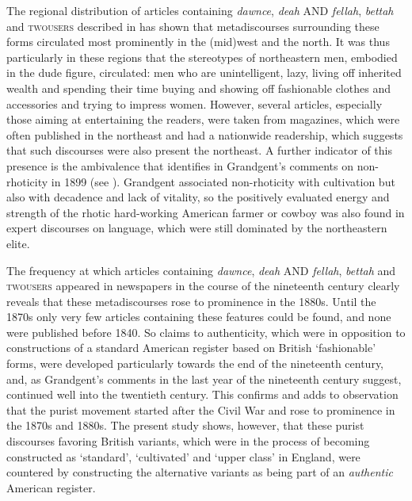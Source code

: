 The regional distribution of articles containing \emph{dawnce}, \emph{deah} AND \emph{fellah}, \emph{bettah} and \textsc{twousers} described in  has shown that metadiscourses surrounding these forms circulated most prominently in the (mid)west and the north. It was thus particularly in these regions that the stereotypes of northeastern men, embodied in the dude figure, circulated: men who are unintelligent, lazy, living off inherited wealth and spending their time buying and showing off fashionable clothes and accessories and trying to impress women. However, several articles, especially those aiming at entertaining the readers, were taken from magazines, which were often published in the northeast and had a nationwide readership, which suggests that such discourses were also present the northeast. A further indicator of this presence is the ambivalence that \citet[48]{Bonfiglio2002} identifies in Grandgent’s comments on non-rhoticity in 1899 (see ). Grandgent associated non-rhoticity with cultivation but also with decadence and lack of vitality, so the positively evaluated energy and strength of the rhotic hard-working American farmer or cowboy was also found in expert discourses on language, which were still dominated by the northeastern elite.

The frequency at which articles containing \emph{dawnce}, \emph{deah} AND \emph{fellah}, \emph{bettah} and \textsc{twousers} appeared in newspapers in the course of the nineteenth century clearly reveals that these metadiscourses rose to prominence in the 1880s. Until the 1870s only very few articles containing these features could be found, and none were published before 1840. So claims to authenticity, which were in opposition to constructions of a standard American register based on British ‘fashionable’ forms, were developed particularly towards the end of the nineteenth century, and, as Grandgent’s comments in the last year of the nineteenth century suggest, continued well into the twentieth century. This confirms and adds to  observation that the purist movement started after the Civil War and rose to prominence in the 1870s and 1880s. The present study shows, however, that these purist discourses favoring British variants, which were in the process of becoming constructed as ‘standard’, ‘cultivated’ and ‘upper class’ in England, were countered by constructing the alternative variants as being part of an \emph{authentic} American register.

